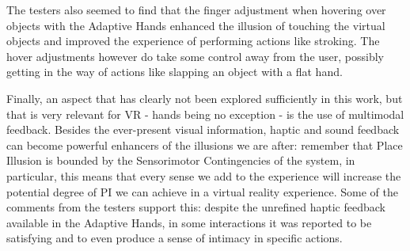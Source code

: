 The testers also seemed to find that the finger adjustment when hovering over objects with the Adaptive Hands enhanced the illusion of touching the virtual objects and improved the experience of performing actions like stroking. The hover adjustments however do take some control away from the user, possibly getting in the way of actions like slapping an object with a flat hand.

Finally, an aspect that has clearly not been explored sufficiently in this work, but that is very relevant for VR - hands being no exception - is the use of multimodal feedback. Besides the ever-present visual information, haptic and sound feedback can become powerful enhancers of the illusions we are after: remember that Place Illusion is bounded by the Sensorimotor Contingencies of the system, in particular, this means that every sense we add to the experience will increase the potential degree of PI we can achieve in a virtual reality experience. Some of the comments from the testers support this: despite the unrefined haptic feedback available in the Adaptive Hands, in some interactions it was reported to be satisfying and to even produce a sense of intimacy in specific actions.